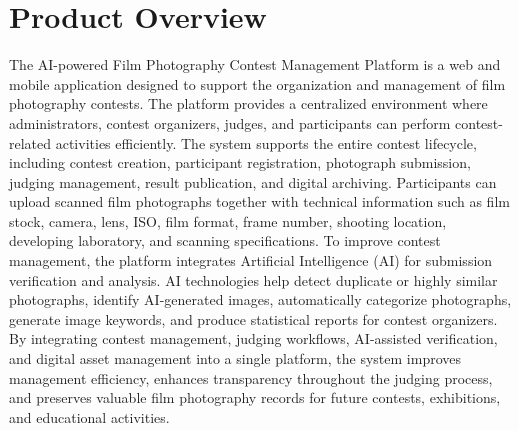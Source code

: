 \section{Product Overview }
The AI-powered Film Photography Contest Management Platform is a web and mobile application designed to support the organization and management of film photography contests. The platform provides a centralized environment where administrators, contest organizers, judges, and participants can perform contest-related activities efficiently.
The system supports the entire contest lifecycle, including contest creation, participant registration, photograph submission, judging management, result publication, and digital archiving. Participants can upload scanned film photographs together with technical information such as film stock, camera, lens, ISO, film format, frame number, shooting location, developing laboratory, and scanning specifications.
To improve contest management, the platform integrates Artificial Intelligence (AI) for submission verification and analysis. AI technologies help detect duplicate or highly similar photographs, identify AI-generated images, automatically categorize photographs, generate image keywords, and produce statistical reports for contest organizers.
By integrating contest management, judging workflows, AI-assisted verification, and digital asset management into a single platform, the system improves management efficiency, enhances transparency throughout the judging process, and preserves valuable film photography records for future contests, exhibitions, and educational activities.
